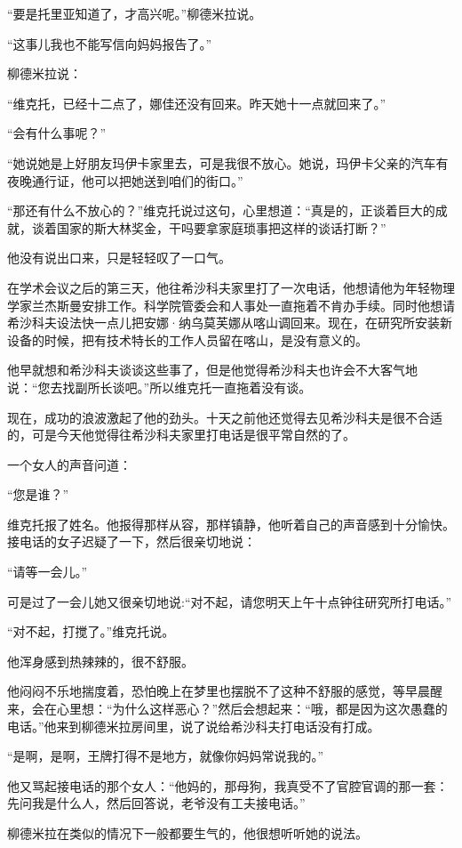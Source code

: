 “要是托里亚知道了，才高兴呢。”柳德米拉说。

“这事儿我也不能写信向妈妈报告了。”

柳德米拉说：

“维克托，已经十二点了，娜佳还没有回来。昨天她十一点就回来了。”

“会有什么事呢？”

“她说她是上好朋友玛伊卡家里去，可是我很不放心。她说，玛伊卡父亲的汽车有夜晚通行证，他可以把她送到咱们的街口。”

“那还有什么不放心的？”维克托说过这句，心里想道：“真是的，正谈着巨大的成就，谈着国家的斯大林奖金，干吗要拿家庭琐事把这样的谈话打断？”

他没有说出口来，只是轻轻叹了一口气。

在学术会议之后的第三天，他往希沙科夫家里打了一次电话，他想请他为年轻物理学家兰杰斯曼安排工作。科学院管委会和人事处一直拖着不肯办手续。同时他想请希沙科夫设法快一点儿把安娜·纳乌莫芙娜从喀山调回来。现在，在研究所安装新设备的时候，把有技术特长的工作人员留在喀山，是没有意义的。

他早就想和希沙科夫谈谈这些事了，但是他觉得希沙科夫也许会不大客气地说：“您去找副所长谈吧。”所以维克托一直拖着没有谈。

现在，成功的浪波激起了他的劲头。十天之前他还觉得去见希沙科夫是很不合适的，可是今天他觉得往希沙科夫家里打电话是很平常自然的了。

一个女人的声音问道：

“您是谁？”

维克托报了姓名。他报得那样从容，那样镇静，他听着自己的声音感到十分愉快。接电话的女子迟疑了一下，然后很亲切地说：

“请等一会儿。”

可是过了一会儿她又很亲切地说:“对不起，请您明天上午十点钟往研究所打电话。”

“对不起，打搅了。”维克托说。

他浑身感到热辣辣的，很不舒服。

他闷闷不乐地揣度着，恐怕晚上在梦里也摆脱不了这种不舒服的感觉，等早晨醒来，会在心里想：“为什么这样恶心？”然后会想起来：“哦，都是因为这次愚蠢的电话。”他来到柳德米拉房间里，说了说给希沙科夫打电话没有打成。

“是啊，是啊，王牌打得不是地方，就像你妈妈常说我的。”

他又骂起接电话的那个女人：“他妈的，那母狗，我真受不了官腔官调的那一套：先问我是什么人，然后回答说，老爷没有工夫接电话。”

柳德米拉在类似的情况下一般都要生气的，他很想听听她的说法。

